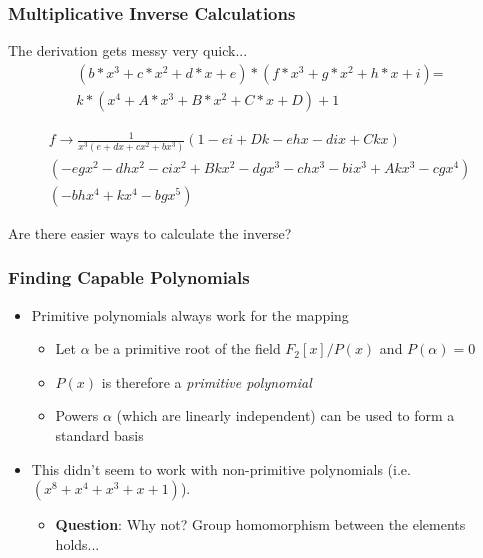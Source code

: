 \documentclass[handout]{beamer}
\begin{document}
\begin{frame}
	\frametitle{Multiplicative Inverse Calculations}
	The derivation gets messy very quick...
	\begin{align*}
	(b*x^3+c*x^2+d*x+e)*(f*x^3+g*x^2+h*x+i)\text{=}\\
	k*(x^4+A*x^3+B*x^2+C*x+D)+1
	\end{align*}
	
	\begin{align*}
	f \to \frac{1}{x^3 \left(e+d x+c x^2+b x^3\right)}\left(1-e i+D k-e h x-d i x+C k x\right) \\ \left(-e g x^2-d h x^2-c i x^2+B k x^2-d g x^3-c
h x^3-b i x^3+A k x^3-c g x^4\right) \\ \left(-b h x^4+k x^4-b g x^5\right)
	\end{align*}
	\begin{center}
		Are there easier ways to calculate the inverse?
	\end{center}


\end{frame}

\begin{frame}
	\frametitle{Finding Capable Polynomials}
	\begin{itemize}
		\item Primitive polynomials always work for the mapping
		\begin{itemize}
			\item Let $\alpha$ be a primitive root of the field $F_2[x]/P(x)$ and $P(\alpha) = 0$
			\item $P(x)$ is therefore a \emph{primitive polynomial}
			\item Powers $\alpha$ (which are linearly independent) can be used to form a standard basis
		\end{itemize} 
		\item This didn't seem to work with non-primitive polynomials (i.e. $(x^8 + x^4 + x^3 + x + 1)$).
		\begin{itemize}
			\item \textbf{Question}: Why not? Group homomorphism between the elements holds...
		\end{itemize}
	\end{itemize}
\end{frame}
\end{document}
